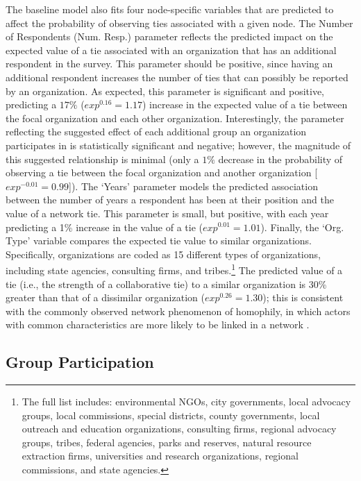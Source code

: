 \documentclass[12pt,a4paper,titlepage]{article}
\begin{document}
The baseline model also fits four node-specific variables that are predicted to affect the probability of observing ties associated with a given node. The Number of Respondents (Num. Resp.) parameter reflects the predicted impact on the expected value of a tie associated with an organization that has an additional respondent in the survey. This parameter should be positive, since having an additional respondent increases the number of ties that can possibly be reported by an organization. As expected, this parameter is significant and positive, predicting a $17\%$ ($exp^{0.16} = 1.17$) increase in the expected value of a tie between the focal organization and each other organization. Interestingly, the parameter reflecting the suggested effect of each additional group an organization participates in is statistically significant and negative; however, the magnitude of this suggested relationship is minimal (only a $1\%$ decrease in the probability of observing a tie between the focal organization and another organization [$exp^{-0.01} = 0.99$]). The `Years' parameter models the predicted association between the number of years a respondent has been at their position and the value of a network tie. This parameter is small, but positive, with each year predicting a 1\% increase in the value of a tie ($exp^{0.01} = 1.01$). Finally, the `Org. Type' variable compares the expected tie value to similar organizations. Specifically, organizations are coded as 15 different types of organizations, including state agencies, consulting firms, and tribes.\footnote{The full list includes: environmental NGOs, city governments, local advocacy groups, local commissions, special districts, county governments, local outreach and education organizations, consulting firms, regional advocacy groups, tribes, federal agencies, parks and reserves, natural resource extraction firms, universities and research organizations, regional commissions, and state agencies.} The predicted value of a tie (i.e., the strength of a collaborative tie) to a similar organization is 30\% greater than that of a dissimilar organization ($exp^{0.26} = 1.30$); this is consistent with the commonly observed network phenomenon of homophily, in which actors with common characteristics are more likely to be linked in a network \parencite{prell2012,kolaczyk2009}.


\subsection{Group Participation}
\end{document}
